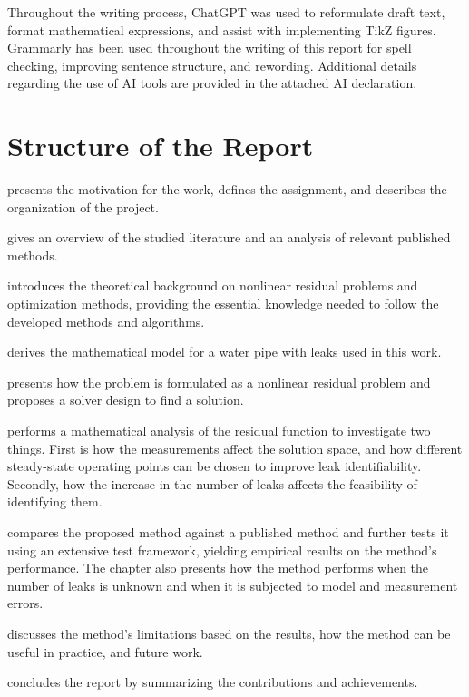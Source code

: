 Throughout the writing process, ChatGPT was used to reformulate draft text, format mathematical expressions, and assist with implementing TikZ figures. Grammarly \cite{grammarly} has been used throughout the writing of this report for spell checking, improving sentence structure, and rewording. Additional details regarding the use of AI tools are provided in the attached AI declaration.

\newpage
\section{Structure of the Report}

\renewcommand{\descriptionlabel}[1]{\normalfont #1}
\begin{description}[itemsep=2pt, topsep=0pt, parsep=0pt]
    \item[Chapter 1] presents the motivation for the work, defines the assignment, and describes the organization of the project.

    \item[Chapter 2] gives an overview of the studied literature and an analysis of relevant published methods.

    \item[Chapter 3] introduces the theoretical background on nonlinear residual problems and optimization methods, providing the essential knowledge needed to follow the developed methods and algorithms.

    \item[Chapter 4] derives the mathematical model for a water pipe with leaks used in this work.

    \item[Chapter 5] presents how the problem is formulated as a nonlinear residual problem and proposes a solver design to find a solution. 

    \item[Chapter 6] performs a mathematical analysis of the residual function to investigate two things. First is how the measurements affect the solution space, and how different steady-state operating points can be chosen to improve leak identifiability. Secondly, how the increase in the number of leaks affects the feasibility of identifying them. 

    \item[Chapter 7] compares the proposed method against a published method and further tests it using an extensive test framework, yielding empirical results on the method's performance. The chapter also presents how the method performs when the number of leaks is unknown and when it is subjected to model and measurement errors.

    \item[Chapter 8] discusses the method's limitations based on the results, how the method can be useful in practice, and future work. 

    \item[Chapter 9] concludes the report by summarizing the contributions and achievements.
\end{description}

